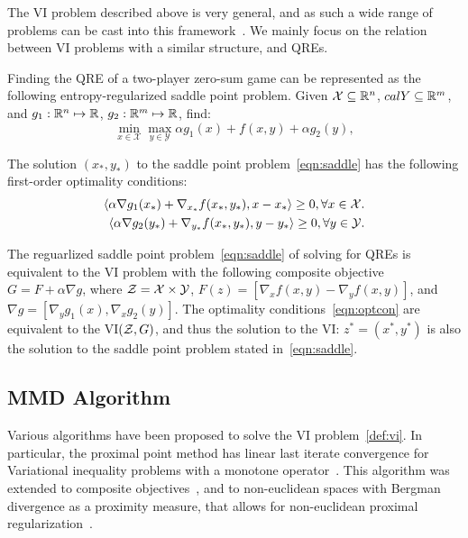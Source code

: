 The VI problem described above is very general, and as such a wide range of problems can be cast into this 
framework~\cite{facchineiFiniteDimensional2004}. We mainly focus on the relation between VI problems with a similar structure, 
and QREs.

Finding the QRE of a two-player zero-sum game can be represented as the following entropy-regularized saddle
point problem. Given $\mathcal{X} \subseteq \mathbb{R}^n$, $calY \subseteq \mathbb{R}^m$, and $g_1: \mathbb{R}^n \mapsto \mathbb{R}$, $g_2: \mathbb{R}^m \mapsto \mathbb{R}$, 
find:
\begin{equation}
	\label{eqn:saddle} \min_{x \in \mathcal{X}}
	\max_{y \in \mathcal{Y}} \alpha g_1(x) + f(x, y) + \alpha g_2(y),
\end{equation}

The solution $(x_{\ast}, y_{\ast})$ to the saddle point problem~\ref{eqn:saddle} has the following first-order optimality conditions:
\begin{equation}
	\label{eqn:optcon} 
	\begin{split}
		\langle \alpha \nabla g_1(x_*) + \nabla_{x_*}
		f(x_*, y_*), x - x_* \rangle \geq 0, \forall x \in \mathcal{X}. \\
		\langle \alpha \nabla g_2(y_*) + \nabla_{y_*} f(x_*, y_*),
		y - y_* \rangle \geq 0, \forall y \in \mathcal{Y}.
	\end{split}
\end{equation}

The reguarlized saddle point problem~\ref{eqn:saddle} of solving for QREs is equivalent to the VI problem 
with the following composite objective $G = F + \alpha \nabla g$,  where $\mathcal{Z} = \mathcal{X} \times \mathcal{Y}$, 
$F(z) = [\nabla_x f(x,y) - \nabla_y f(x,y)]$, and $\nabla g = [\nabla_y g_1(x), \nabla_x g_2(y)]$.
The optimality conditions~\ref{eqn:optcon} are equivalent to the VI$(\mathcal{Z}, G)$, and thus the solution 
to the VI: $z^* = (x^*, y^*)$ is also the solution to the saddle point problem stated in~\ref{eqn:saddle}.

\subsection{MMD Algorithm}

Various algorithms have been proposed to solve the VI problem~\ref{def:vi}.
In particular, the proximal point method has linear last iterate convergence for Variational 
inequality problems with a monotone operator~\cite{rockafellarMonotone1976}.
This algorithm was extended to composite objectives~\cite{tsenglinear1995}, and to non-euclidean 
spaces with Bergman divergence as a proximity measure, 
that allows for non-euclidean proximal regularization~\cite{tsengApproximation2010}.

